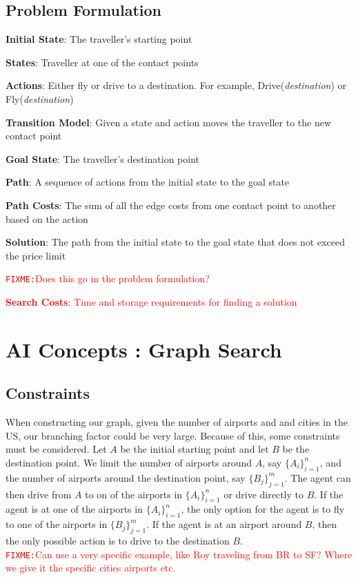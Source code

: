 \documentclass[11pt]{article}
\newcommand{\FIXME}[1]{ \ \\ \hspace* {-1.5 cm}
  \textcolor{red}{\texttt{FIXME:}#1} \medskip\par}
\begin{document}
\subsection{Problem Formulation}
\begin{enumerate}
\item \textbf{Initial State}: The traveller's starting point
\item \textbf{States}: Traveller at one of the contact points
\item	 \textbf{Actions}: Either fly or drive to a destination. For example, Drive(\emph{destination}) or Fly(\emph{destination})
\item \textbf{Transition Model}: Given a state and action moves the traveller to the new contact point
\item \textbf{Goal State}: The traveller's destination point
\item \textbf{Path}: A sequence of actions from the initial state to the goal state
\item \textbf{Path Costs}: The sum of all the edge costs from one contact point to another based on the action%
\item \textbf{Solution}: The path from the initial state to the goal state that does not exceed the price limit
\FIXME{Does this go in the problem formulation?
\item \textbf{Search Costs}: Time and storage requirements for finding a solution}
\end{enumerate}


\section{AI Concepts : Graph Search}


\subsection{Constraints}
When constructing our graph, given the number of airports and and cities in the US, our branching factor could be very large. Because of this, some constraints must be considered. Let $A$ be the initial starting point and let $B$ be the destination point. We limit the number of airports around $A$, say $\{ A_i \}_{i=1}^n$, and the number of airports around the destination point, say $\{ B_j \}_{j=1}^m$. The agent can then drive from $A$ to on of the airports in $\{ A_i \}_{i=1}^n$ or drive directly to $B$. If the agent is at one of the airports in $\{ A_i \}_{i=1}^n$, the only option for the agent is to fly to one of the airports in $\{ B_j \}_{j=1}^m$. If the agent is at an airport around $B$, then the only possible action is to drive to the destination $B$.
\FIXME{Can use a very specific example, like Roy traveling from BR to SF? Where we give it the specific cities airports etc.}
\end{document}
